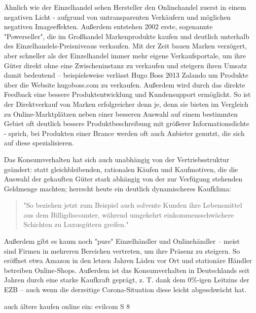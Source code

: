 Ähnlich wie der Einzelhandel sehen Hersteller den Onlinehandel zuerst in einem negativen Licht - aufgrund von untransparenten Verkäufern und möglichen negativen Imageeffekten\cite[S. 20]{Graf}. Außerdem entstehen 2002 erste, sogenannte "Powerseller", die im Großhandel Markenprodukte kaufen und deutlich unterhalb des Einzelhandels-Preisniveaus verkaufen\cite[S. 26]{Graf}. Mit der Zeit bauen Marken verzögert, aber schneller als der Einzelhandel immer mehr eigene Verkaufsportale, um ihre Güter direkt ohne eine Zwischeninstanz zu verkaufen und steigern ihren Umsatz damit bedeutend – beispielsweise verlässt Hugo Boss 2013 Zalando um Produkte über die Website hugoboss.com zu verkaufen\cite[S. 48f]{Graf}. Außerdem wird durch das direkte Feedback eine bessere Produktentwicklung und Kundensupport ermöglicht\cite[S. 39]{Graf}. So ist der Direktverkauf von Marken erfolgreicher denn je, denn sie bieten im Vergleich zu Online-Marktplätzen neben einer besseren Auswahl auf einem bestimmten Gebiet oft deutlich bessere Produktbeschreibung mit größerer Informationsdichte - sprich, bei Produkten einer Brance werden oft auch Anbieter genutzt, die sich auf diese spezialisieren\cite[S. 18f]{evilcom}.


Das Konsumverhalten hat sich auch unabhängig von der Vertriebsstruktur geändert: statt gleichbleibenden, rationalen Käufen und Kaufmotiven, die die Auswahl der gekauften Güter stark abhängig von der zur Verfügung stehenden Geldmenge machten\cite[S. 38]{Schramm}; herrscht heute ein deutlich dynamischeres Kaufklima:
\begin{quote}
"So beziehen jetzt zum Beispiel auch solvente Kunden ihre Lebensmittel aus dem Billigdiscounter, während  umgekehrt  einkommensschwächere  Schichten  zu  Luxusgütern  greifen."\cite[S. 43]{Nitt}
\end{quote}
Außerdem gibt es kaum noch "pure" Einzelhändler und Onlinehändler – meist sind Firmen in mehreren Bereichen vertreten, um ihre Präsenz zu steigern. So eröffnet etwa Amazon in den letzen Jahren Läden vor Ort und stationäre Händler betreiben Online-Shops\cite[S. 50]{Graf}.
Außerdem ist das Konsumverhalten in Deutschlands seit Jahren durch eine starke Kaufkraft geprägt, z. T. dank dem 0\%-igen Leitzins der \ac{EZB}\cite[S. 49]{Ebert} – auch wenn die derzeitige Corona-Situation diese leicht abgeschwächt hat\cite{BfWE}. 

\iffalse 
       
        auch ältere kaufen online ein: evilcom S 8
        

